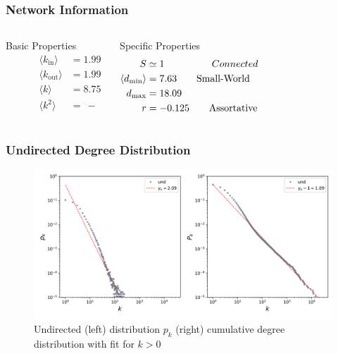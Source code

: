 \documentclass[fleqn]{beamer}
\begin{document}
    \begin{frame}
        \frametitle{Network Information}
      \begin{columns}[T]
            \begin{block}{\centering Basic Properties}
                \begin{align*}
                   \quad\qquad \langle k_{\text{in}}\rangle  &= 1.99\\
                   \quad\qquad \langle k_{\text{out}}\rangle  &= 1.99\\
                   \quad\qquad \langle k\rangle  &= 8.75\\
                   \quad\qquad \langle k^2\rangle  &=\ -
                \end{align*}
          \end{block}

        \begin{block}{\centering Specific Properties}
                \begin{align*}
                    S &\simeq 1 \hspace{1.7cm} Connected\\
                      \langle d_\text{min}\rangle  &= 7.63 \qquad
                      \text{Small-World}\\
                      d_{\text{max}} &= 18.09\\
                      r &= -0.125 \qquad \text{Assortative}\\
                \end{align*}
        \end{block}
        \end{columns}
    \end{frame}

    \begin{frame}
        \frametitle{Undirected Degree Distribution}
    \begin{figure}[htpb]
        \centering
        \includegraphics[width=1\textwidth]{./pics/dist_u.png}
        \caption{Undirected (left) distribution $p_k$ (right) cumulative
        degree distribution with fit for $k > 0$}
    \end{figure}
    \end{frame}
\end{document}
